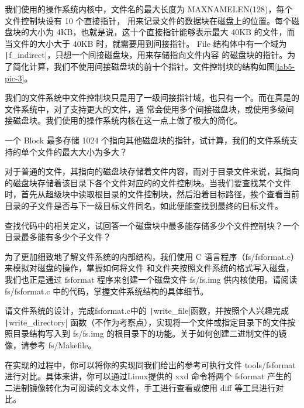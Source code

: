 我们使用的操作系统内核中，文件名的最大长度为 MAXNAMELEN(128)，每个文件控制块设有 10 个直接指针，
用来记录文件的数据块在磁盘上的位置。每个磁盘块的大小为 4KB，也就是说，这十个直接指针能够表示最大 40KB
的文件，而当文件的大小大于 40KB 时，就需要用到间接指针。
File 结构体中有一个域为 \texttt|f_indirect|，只想一个间接磁盘块，用来存储指向文件内容
的磁盘块的指针。为了简化计算，我们不使用间接磁盘块的前十个指针。文件控制块的结构如图\ref{lab5-pic-3}。

\begin{note}
我们的文件系统中文件控制块只是用了一级间接指针域，也只有一个。而在真是的文件系统中，对了支持更大的文件，通
常会使用多个间接磁盘块，或使用多级间接磁盘块。我们使用的操作系统内核在这一点上做了极大的简化。
\end{note}

\begin{thinking}\label{think-filesize}
一个 Block 最多存储 1024 个指向其他磁盘块的指针，试计算，我们的文件系统支持的单个文件的最大大小为多大？
\end{thinking}

对于普通的文件，其指向的磁盘块存储着文件内容，而对于目录文件来说，其指向的磁盘块存储着该目录下各个文件对应的的文件控制块。当我们要查找某个文件时，首先从超级块中读取根目录的文件控制块，然后沿着目标路径，挨个查看当前目录的子文件是否与下一级目标文件同名，如此便能查找到最终的目标文件。

\begin{thinking}\label{think-filenum}
查找代码中的相关定义，试回答一个磁盘块中最多能存储多少个文件控制块？一个目录最多能有多少个子文件？
\end{thinking}

为了更加细致地了解文件系统的内部结构，我们使用 C 语言程序（fs/fsformat.c）来模拟对磁盘的操作，掌握如何将文件
和文件夹按照文件系统的格式写入磁盘，我们也正是通过 fsformat 程序来创建一个磁盘文件 fs/fs.img 供内核使用。请阅读 fs/fsformat.c 中的代码，掌握文件系统结构的具体细节。

\begin{exercise}
请文件系统的设计，完成fsformat.c中的 \texttt|write_file|函数，并按照个人兴趣完成 \texttt|write_directory| 函数（不作为考察点），实现将一个文件或指定目录下的文件按照目录结构写入到 fs/fs.img 的根目录下的功能。关于如何创建二进制文件的镜像，请参考 fs/Makefile。

在实现的过程中，你可以将你的实现同我们给出的参考可执行文件 tools/fsformat 进行对比。具体来讲，你可以通过Linux提供的 xxd 命令将两个 fsformat 产生的二进制镜像转化为可阅读的文本文件，手工进行查看或使用 diff 等工具进行对比。
\end{exercise}

